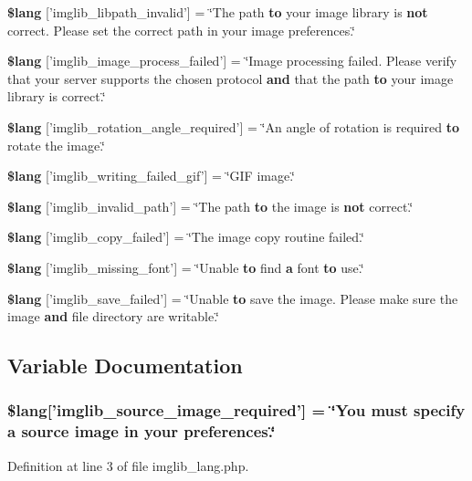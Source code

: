 \begin{DoxyCompactItemize}
\item 
{\bf \$lang} ['imglib\-\_\-libpath\-\_\-invalid'] = \char`\"{}The path {\bf to} your image library is {\bf not} correct. Please set the correct path in your image preferences.\char`\"{}
\item 
{\bf \$lang} ['imglib\-\_\-image\-\_\-process\-\_\-failed'] = \char`\"{}Image processing failed. Please verify that your server supports the chosen protocol {\bf and} that the path {\bf to} your image library is correct.\char`\"{}
\item 
{\bf \$lang} ['imglib\-\_\-rotation\-\_\-angle\-\_\-required'] = \char`\"{}An angle of rotation is required {\bf to} rotate the image.\char`\"{}
\item 
{\bf \$lang} ['imglib\-\_\-writing\-\_\-failed\-\_\-gif'] = \char`\"{}G\-I\-F image.\char`\"{}
\item 
{\bf \$lang} ['imglib\-\_\-invalid\-\_\-path'] = \char`\"{}The path {\bf to} the image is {\bf not} correct.\char`\"{}
\item 
{\bf \$lang} ['imglib\-\_\-copy\-\_\-failed'] = \char`\"{}The image copy routine failed.\char`\"{}
\item 
{\bf \$lang} ['imglib\-\_\-missing\-\_\-font'] = \char`\"{}Unable {\bf to} find {\bf a} font {\bf to} use.\char`\"{}
\item 
{\bf \$lang} ['imglib\-\_\-save\-\_\-failed'] = \char`\"{}Unable {\bf to} save the image. Please make sure the image {\bf and} file directory are writable.\char`\"{}
\end{DoxyCompactItemize}


\subsection{Variable Documentation}
\subsubsection[{\$lang}]{\setlength{\rightskip}{0pt plus 5cm}\$lang['imglib\-\_\-source\-\_\-image\-\_\-required'] = \char`\"{}You must specify {\bf a} source image in your preferences.\char`\"{}}\label{imglib__lang_8php_af48787ab142f633036ebdf1cc5da7409}


Definition at line 3 of file imglib\-\_\-lang.\-php.

